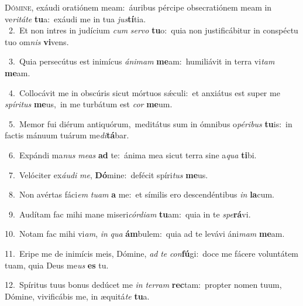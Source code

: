 \lettrine{\initial\textcolor{\initialcolor}{D}}{ómine,} exáudi oratiónem meam:~\dagger áuribus pércipe obsecratiónem meam in ve\-\textit{ri}\-\textit{tá}\textit{te} \textbf{tu}\-a:~\star exáudi me in tua \textit{jus}\-\textbf{tí}tia.\\
{\numbfont\textcolor{\numbcolor}{~2.}}~Et non intres in judícium \textit{cum} \textit{ser}\-\textit{vo} \textbf{tu}\-o:~\star quia non justificábitur in conspéctu tuo om\textit{nis} \textbf{vi}\-vens.\par
{\numbfont\textcolor{\numbcolor}{~3.}}~Quia persecútus est inimícus \textit{á}\-\textit{ni}\textit{mam} \textbf{me}\-am:~\star humiliávit in terra vi\textit{tam} \textbf{me}\-am.\par
{\numbfont\textcolor{\numbcolor}{~4.}}~Collocávit me in obscúris sicut mórtuos sǽculi:~\dagger et anxiátus est super me \textit{spí}\-\textit{ri}\textit{tus} \textbf{me}\-us,~\star in me turbátum est \textit{cor} \textbf{me}\-um.\par
{\numbfont\textcolor{\numbcolor}{~5.}}~Memor fui diérum antiquórum,~\dagger meditátus sum in ómnibus o\-\textit{pé}\-\textit{ri}\textit{bus} \textbf{tu}\-is:~\star in factis mánuum tuárum me\-\textit{di}\-\textbf{tá}bar.\par
{\numbfont\textcolor{\numbcolor}{~6.}}~Expándi ma\textit{nus} \textit{me}\-\textit{as} \textbf{ad} te:~\star ánima mea sicut terra sine a\textit{qua} \textbf{ti}\-bi.\par
{\numbfont\textcolor{\numbcolor}{~7.}}~Velóciter ex\-\textit{áu}\-\textit{di} \textit{me}\-, \textbf{Dó}\-mine:~\star defécit spíri\textit{tus} \textbf{me}\-us.\par
{\numbfont\textcolor{\numbcolor}{~8.}}~Non avértas fáci\textit{em} \textit{tu}\-\textit{am} \textbf{a} me:~\star et símilis ero descendéntibus \textit{in} \textbf{la}\-cum.\par
{\numbfont\textcolor{\numbcolor}{~9.}}~Audítam fac mihi mane miseri\-\textit{cór}\-\textit{di}\textit{am} \textbf{tu}\-am:~\star quia in te \textit{spe}\-\textbf{rá}vi.\par
{\numbfont\textcolor{\numbcolor}{10.}}~Notam fac mihi vi\-\textit{am}\-, \textit{in} \textit{qua} \textbf{ám}\-bulem:~\star quia ad te levávi áni\textit{mam} \textbf{me}\-am.\par
{\numbfont\textcolor{\numbcolor}{11.}}~Eripe me de inimícis meis, Dómine, \textit{ad} \textit{te} \textit{con}\-\textbf{fú}gi:~\star doce me fácere voluntátem tuam, quia Deus me\textit{us} \textbf{es} tu.\par
{\numbfont\textcolor{\numbcolor}{12.}}~Spíritus tuus bonus dedúcet me \textit{in} \textit{ter}\-\textit{ram} \textbf{rec}\-tam:~\star propter nomen tuum, Dómine, vivificábis me, in æquitá\textit{te} \textbf{tu}\-a.\par
